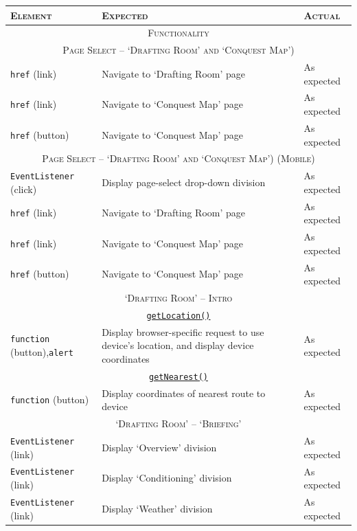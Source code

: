\documentclass[11pt, english]{article}
\begin{document}
	\begin{center}
		\scriptsize
	\begin{longtable}{p{3cm}p{8cm}p{2cm}}
		\textsc{Element} & \textsc{Expected} & \textsc{Actual}\\
		\hline
		\hline
		\multicolumn{3}{c}{\textsc{Functionality}}\\
		\hline
		\hline
		\multicolumn{3}{c}{\textsc{Page Select -- `Drafting Room' and `Conquest Map')}}\\
		\hline
		\texttt{href} (link) & Navigate to `Drafting Room' page & As expected\\
		\texttt{href} (link) & Navigate to `Conquest Map' page & As expected\\
		\texttt{href} (button) & Navigate to `Conquest Map' page & As expected\\
		\hline
		\multicolumn{3}{c}{\textsc{Page Select -- `Drafting Room' and `Conquest Map') (Mobile)}}\\
		\hline
		\texttt{EventListener} (click) & Display page-select drop-down division & As expected\\
		\texttt{href} (link) & Navigate to `Drafting Room' page & As expected\\
		\texttt{href} (link) & Navigate to `Conquest Map' page & As expected\\
		\texttt{href} (button) & Navigate to `Conquest Map' page & As expected\\
		\hline
		\multicolumn{3}{c}{\textsc{`Drafting Room' -- Intro}}\\
		\hline
		\multicolumn{3}{c}{\underline{\texttt{getLocation()}}}\\
		\texttt{function} (button),\newline \texttt{alert} & Display browser-specific request to use device's location, and display device coordinates & As expected\\
		\multicolumn{3}{c}{\underline{\texttt{getNearest()}}}\\
		\texttt{function} (button) & Display coordinates of nearest route to device & As expected\\
		\hline
		\multicolumn{3}{c}{\textsc{`Drafting Room' -- `Briefing'}}\\
		\hline
		\texttt{EventListener} (link) & Display `Overview' division & As expected\\
		\texttt{EventListener} (link) & Display `Conditioning' division & As expected\\
		\texttt{EventListener} (link) & Display `Weather' division & As expected\\

\end{longtable}
\end{center}
\end{document}
